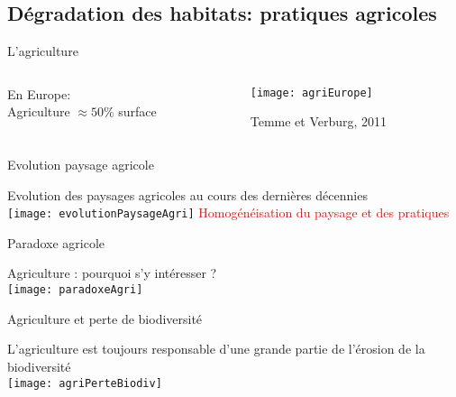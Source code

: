 \documentclass[10pt]{beamer}
\begin{document}
\subsection{Dégradation des habitats: pratiques agricoles}

\begin{frame}{L'agriculture}
 \begin{columns}[c]
    \begin{column}[c]{0.4\textwidth}
     \begin{center}
       En Europe: \\ Agriculture $\approx 50\%$  surface 
     \end{center}
    \end{column}
     \begin{column}[c]{0.6\textwidth}
      \begin{center}
     \texttt{[image: agriEurope]}
      \end{center}
      \begin{tiny}
    Temme et Verburg, 2011
  \end{tiny}
    \end{column}
  \end{columns}
\end{frame}

\begin{frame}{Evolution paysage agricole}
\begin{center}
Evolution des paysages agricoles au cours des dernières décennies \\
\vspace{10pt}
 \texttt{[image: evolutionPaysageAgri]}
 \vspace{10pt}
 \textcolor{red}{Homogénéisation du paysage et des pratiques}
 \end{center}
\end{frame}

\begin{frame}{Paradoxe agricole}
\begin{center}
Agriculture : pourquoi s’y intéresser ?\\
\vspace{10pt}
 \texttt{[image: paradoxeAgri]}
 \end{center}
\end{frame}


\begin{frame}{Agriculture et perte de biodiversité}
\begin{center}
 L’agriculture est toujours responsable d’une grande partie de l’érosion de la biodiversité\\
 \vspace{10pt}
\texttt{[image: agriPerteBiodiv]}
 \end{center}
\end{frame}
\end{document}

